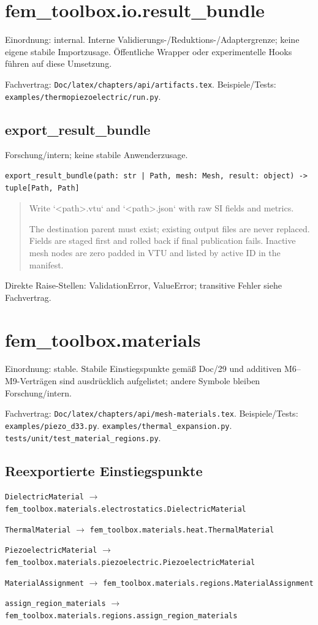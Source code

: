 \section{fem\_toolbox.io.result\_bundle}
Einordnung: internal. Interne Validierungs-/Reduktions-/Adaptergrenze; keine eigene stabile Importzusage. Öffentliche Wrapper oder experimentelle Hooks führen auf diese Umsetzung.
\par Fachvertrag: \nolinkurl{Doc/latex/chapters/api/artifacts.tex}. Beispiele/Tests:
\nolinkurl{examples/thermopiezoelectric/run.py}.
\subsection{export\_result\_bundle}
Forschung/intern; keine stabile Anwenderzusage.
\begin{lstlisting}
export_result_bundle(path: str | Path, mesh: Mesh, result: object) -> tuple[Path, Path]
\end{lstlisting}
\begin{quote}
Write `<path>.vtu` and `<path>.json` with raw SI fields and metrics.\par The destination parent must exist; existing output files are never replaced. Fields are staged first and rolled back if final publication fails. Inactive mesh nodes are zero padded in VTU and listed by active ID in the manifest.
\end{quote}
Direkte Raise-Stellen: ValidationError, ValueError; transitive Fehler siehe Fachvertrag.
\section{fem\_toolbox.materials}
Einordnung: stable. Stabile Einstiegspunkte gemäß Doc/29 und additiven M6–M9-Verträgen sind ausdrücklich aufgelistet; andere Symbole bleiben Forschung/intern.
\par Fachvertrag: \nolinkurl{Doc/latex/chapters/api/mesh-materials.tex}. Beispiele/Tests:
\nolinkurl{examples/piezo_d33.py}.
\nolinkurl{examples/thermal_expansion.py}.
\nolinkurl{tests/unit/test_material_regions.py}.
\subsection*{Reexportierte Einstiegspunkte}
\noindent\nolinkurl{DielectricMaterial} $\to$ \nolinkurl{fem_toolbox.materials.electrostatics.DielectricMaterial}\par
\noindent\nolinkurl{ThermalMaterial} $\to$ \nolinkurl{fem_toolbox.materials.heat.ThermalMaterial}\par
\noindent\nolinkurl{PiezoelectricMaterial} $\to$ \nolinkurl{fem_toolbox.materials.piezoelectric.PiezoelectricMaterial}\par
\noindent\nolinkurl{MaterialAssignment} $\to$ \nolinkurl{fem_toolbox.materials.regions.MaterialAssignment}\par
\noindent\nolinkurl{assign_region_materials} $\to$ \nolinkurl{fem_toolbox.materials.regions.assign_region_materials}\par
